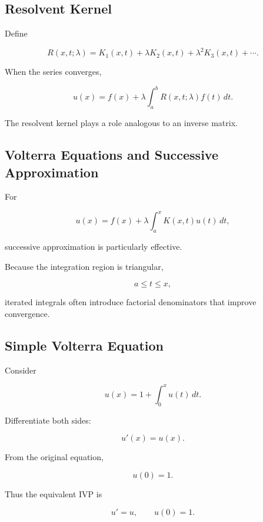 \subsection{Resolvent Kernel}
\label{subsec:resolvent-kernel}

Define

\[
\boxed{
R(x,t;\lambda)
=
K_1(x,t)
+
\lambda K_2(x,t)
+
\lambda^2K_3(x,t)
+
\cdots.
}
\]

When the series converges,

\[
\boxed{
u(x)
=
f(x)
+
\lambda
\int_a^b
R(x,t;\lambda)
f(t)\,dt.
}
\]

The resolvent kernel plays a role analogous to an inverse matrix.

\subsection{Volterra Equations and Successive Approximation}
\label{subsec:volterra-successive-approximation}

For

\[
u(x)
=
f(x)
+
\lambda
\int_a^x
K(x,t)u(t)\,dt,
\]

successive approximation is particularly effective.

Because the integration region is triangular,

\[
a\leq t\leq x,
\]

iterated integrals often introduce factorial denominators that improve
convergence.

\subsection{Simple Volterra Equation}
\label{subsec:simple-volterra-equation}

Consider

\[
\boxed{
u(x)
=
1
+
\int_0^x
u(t)\,dt.
}
\]

Differentiate both sides:

\[
u'(x)
=
u(x).
\]

From the original equation,

\[
u(0)=1.
\]

Thus the equivalent IVP is

\[
\boxed{
u'=u,
\qquad
u(0)=1.
}
\]

